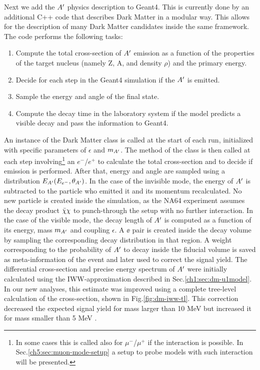 Next we add the $A'$ physics description to Geant4. This is currently done by an additional C++ code that describes Dark Matter in a modular way. This allows for the description of many Dark Matter candidates inside the same framework. The code performs the following tasks:

\begin{enumerate}
\item Compute the total cross-section of $A'$ emission as a function of the properties of the target nucleus (namely Z, A, and density $\rho$) and the primary energy.
\item Decide for each step in the Geant4 simulation if the $A'$ is emitted.
\item Sample the energy and angle of the final state.
\item Compute the decay time in the laboratory system if the model predicts a visible decay and pass the information to Geant4.
\end{enumerate}

An instance of the Dark Matter class is called at the start of each run, initialized with specific parameters of $\epsilon$ and $m_{A'}$. The method of the class is then called at each step involving\footnote{In some cases this is called also for $\mu^-$/$\mu^+$ if the interaction is possible. In Sec.\ref{ch5:sec:muon-mode-setup} a setup to probe models with such interaction will be presented.} an $e^-$/$e^+$ to calculate the total cross-section and to decide if emission is performed. After that, energy and angle are sampled using a distribution $E_{A'}(E_{e^-}, \theta_{A'})$. In the case of the invisible mode, the energy of $A'$ is subtracted to the particle who emitted it and its momentum recalculated. No new particle is created inside the simulation, as the NA64 experiment assumes the decay product $\bar{\chi} \chi$ to punch-through the setup with no further interaction. In the case of the visible mode, the decay length of $A'$ is computed as a function of its energy, mass $m_{A'}$ and coupling $\epsilon$. A $\ee$ pair is created inside the decay volume by sampling the corresponding decay distribution in that region. A weight corresponding to the probability of $A'$ to decay inside the fiducial volume is saved as meta-information of the event and later used to correct the signal yield.
The differential cross-section and precise energy spectrum of $A'$ were initially calculated using the IWW-approximation described in Sec.\ref{ch1:sec:dm-u1model}. In our new analyses, this estimate was improved using a complete tree-level calculation of the cross-section, shown in Fig.\ref{fig:dm-iww-tl}. This correction decreased the expected signal yield for mass larger than 10 MeV but increased it for mass smaller than 5 MeV \cite{DMsimulation}.

